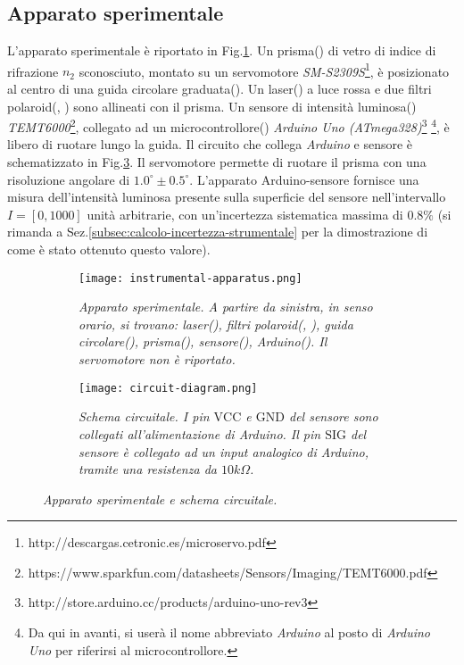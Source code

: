 \subsection{Apparato sperimentale}\label{subsec:apparato-sperimentale}
  L’apparato sperimentale è riportato in Fig.\ref{fig:apparato-strumentale}.
  Un prisma() di vetro di indice di rifrazione $n_2$ sconosciuto, montato su un servomotore \emph{SM-S2309S}\footnote{http://descargas.cetronic.es/microservo.pdf},
  è posizionato al centro di una guida circolare graduata().
  Un laser() a luce rossa e due filtri polaroid(, ) sono
  allineati con il prisma. Un sensore di intensità luminosa() \emph{TEMT6000}\footnote{https://www.sparkfun.com/datasheets/Sensors/Imaging/TEMT6000.pdf},
  collegato ad un microcontrollore() \emph{Arduino Uno (ATmega328)}\footnote{http://store.arduino.cc/products/arduino-uno-rev3}%
  \footnote{Da qui in avanti, si userà il nome abbreviato \emph{Arduino} al posto di \emph{Arduino Uno} per riferirsi al microcontrollore.},
  è libero di ruotare lungo la guida.
  Il circuito che collega \emph{Arduino} e sensore è schematizzato in Fig.\ref{fig:diagramma-circuito}.
  Il servomotore permette di ruotare il prisma con una risoluzione angolare di ${1.0^\circ \pm 0.5^\circ}$.
  L'apparato Arduino-sensore fornisce una misura dell'intensità luminosa presente
  sulla superficie del sensore nell'intervallo $I = [0, 1000]$ unità arbitrarie,
  con un'incertezza sistematica massima di $0.8\%$ (si rimanda a Sez.\ref{subsec:calcolo-incertezza-strumentale}
  per la dimostrazione di come è stato ottenuto questo valore).
%
  \begin{figure}[h]
    \centering
    \begin{subfigure}{.47\textwidth}
      \texttt{[image: instrumental-apparatus.png]}
      \caption{
        \emph{
          Apparato sperimentale. A partire da sinistra, in senso orario,
          si trovano: laser(), filtri polaroid(, ), guida circolare(),
          prisma(), sensore(), Arduino(). Il servomotore non è riportato.
        }
      }
      \label{fig:apparato-strumentale}
    \end{subfigure}%
    \hspace{5mm}
    \begin{subfigure}{.47\textwidth}
      \texttt{[image: circuit-diagram.png]}
      \caption{
        \emph{
          Schema circuitale. I pin $\text{VCC}$ e $\text{GND}$ del sensore sono collegati
          all'alimentazione di Arduino. Il pin $\text{SIG}$
          del sensore è collegato ad un input analogico di Arduino, tramite una
          resistenza da $10k\Omega$.
        }
      }
      \label{fig:diagramma-circuito}
    \end{subfigure}
    \caption{\emph{Apparato sperimentale e schema circuitale.}}
  \end{figure}
%
